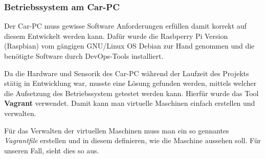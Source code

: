 \subsubsection{Betriebssystem am Car-PC}

Der Car-PC muss gewisse Software Anforderungen erfüllen damit korrekt auf diesem Entwickelt werden kann. Dafür wurde die Rasbperry Pi Version (Raspbian) vom gängigen GNU/Linux OS Debian zur Hand genommen und die benötigte Software durch DevOps-Tools installiert.

Da die Hardware und Sensorik des Car-PC während der Laufzeit des Projekts stätig in Entwicklung war, musste eine Lösung gefunden werden, mittels welcher die Aufsetzung des Betriebssystem getestet werden kann. Hierfür wurde das Tool \textbf{Vagrant} verwendet. Damit kann man virtuelle Maschinen einfach erstellen und verwalten. 

Für das Verwalten der virtuellen Maschinen muss man ein so gennantes \textit{Vagrantfile} erstellen und in diesem definieren, wie die Maschine aussehen soll. Für unseren Fall, sieht dies so aus.

